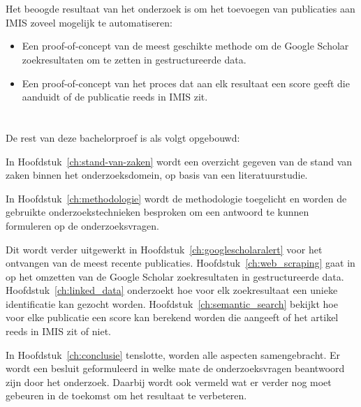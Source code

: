 \section{}%
\label{sec:onderzoeksdoelstelling}

Het beoogde resultaat van het onderzoek is om het toevoegen van publicaties aan IMIS zoveel mogelijk te automatiseren:
\begin{itemize}
    \item Een proof-of-concept van de meest geschikte methode om de Google Scholar zoekresultaten om te zetten in gestructureerde data.
    \item Een proof-of-concept van het proces dat aan elk resultaat een score geeft die aanduidt of de publicatie reeds in IMIS zit.
\end{itemize}

\section{}%
\label{sec:opzet-bachelorproef}


De rest van deze bachelorproef is als volgt opgebouwd:

In Hoofdstuk~\ref{ch:stand-van-zaken} wordt een overzicht gegeven van de stand van zaken binnen het onderzoeksdomein, op basis van een literatuurstudie.

In Hoofdstuk~\ref{ch:methodologie} wordt de methodologie toegelicht en worden de gebruikte onderzoekstechnieken besproken om een antwoord te kunnen formuleren op de onderzoeksvragen.

Dit wordt verder uitgewerkt in Hoofdstuk~\ref{ch:googlescholaralert} voor het ontvangen van de meest recente publicaties. Hoofdstuk~\ref{ch:web_scraping} gaat in op het omzetten van de Google Scholar zoekresultaten in gestructureerde data. Hoofdstuk~\ref{ch:linked_data} onderzoekt hoe voor elk zoekresultaat een unieke identificatie kan gezocht worden. Hoofdstuk~\ref{ch:semantic_search} bekijkt hoe voor elke publicatie een score kan berekend worden die aangeeft of het artikel reeds in IMIS zit of niet.


In Hoofdstuk~\ref{ch:conclusie} tenslotte, worden alle aspecten samengebracht. Er wordt een besluit geformuleerd in welke mate de onderzoeksvragen beantwoord zijn door het onderzoek. Daarbij wordt ook vermeld wat er verder nog moet gebeuren in de toekomst om het resultaat te verbeteren.